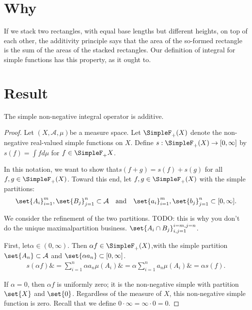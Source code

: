 

\section*{Why}

If we stack two rectangles, with equal base lengths but different heights, on top of each other, the additivity principle says that the area of the so-formed rectangle is the sum of the areas of the stacked rectangles.
Our definition of integral for simple functions has this property, as it ought to.

\section*{Result}

\begin{proposition}
The simple non-negative integral operator is additive.\end{proposition}
\begin{proof}Let $(X, \mathcal{A} , \mu )$be a measure space.
Let $\SimpleF_+(X)$ denote the non-negative real-valued simple functions on $X$.
Define $s: \SimpleF_+(X) \to [0, \infty]$ by $s(f) = \int f d\mu $ for $f \in \SimpleF_+{X}$.

In this notation, we want to show that$s(f+g) = s(f) + s(g)$ for all $f, g \in \SimpleF_+(X)$.
Toward this end, let $f,g \in \SimpleF_+(X)$ with the simple partitions:
    \[
\set{A_i}_{i = 1}^{m},\set{B_j}_{j = 1}^{n} \subset \mathcal{A} \quad \text{and} \quad\set{a_i}_{i = 1}^{m},\set{b_j}_{j = 1}^{n} \subset [0, \infty].
    \]

We consider the refinement of the two partitions.
TODO: this is why you don't do the unique maximalpartition business.
$\set{A_i \cap  B_j}_{i, j = 1}^{i = m, j = n}$.


First, let$\alpha  \in (0, \infty)$.
Then $\alpha  f \in \SimpleF_+(X)$,with the simple partition$\set{A_n} \subset \mathcal{A} $ and $\set{\alpha  a_n} \subset [0, \infty]$.
  \[
\begin{aligned}
s(\alpha  f) \&= \sum_{i = 1}^{n} \alpha  a_n \mu (A_i)
\&= \alpha  \sum_{i = 1}^{n} a_n \mu (A_i)
\&= \alpha  s(f).
\end{aligned}
  \]

If $\alpha  = 0$, then $\alpha  f$ is uniformly zero; it is the non-negative simple with partition $\set{X}$ and $\set{0}$.
Regardless of the measure of $X$, this non-negative simple function is zero.
Recall that we define $0\cdot \infty = \infty\cdot 0 = 0$.\end{proof}